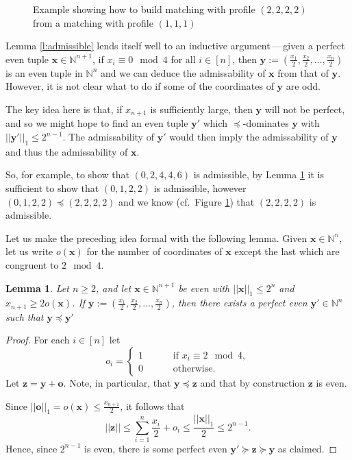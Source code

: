 \documentclass{article}
\newtheorem{lemma}[theorem]{Lemma}
\begin{document}
\begin{figure}[!ht]
\begin{minipage}{.4\textwidth}
\end{minipage}
\hfill
\caption{Example showing how to build matching with profile $(2,2,2,2)$ from a matching with profile $(1,1,1)$}\label{f:3dim}
\end{figure}

Lemma \ref{l:admissible} lends itself well to an inductive argument\,---\,given a perfect even tuple $\bm{x} \in \mathbb{N}^{n+1}$, if $x_i \equiv 0 \mod 4$ for all $i \in [n]$, then $\bm{y} := \left( \frac{x_1}{2},\frac{x_2}{2},\ldots,\frac{x_n}{2}\right)$ is an even tuple in $\mathbb{N}^{n}$ and we can deduce the admissability of $\bm{x}$ from that of $\bm{y}$. However, it is not clear what to do if some of the coordinates of $\bm{y}$ are odd.

The key idea here is that, if $x_{n+1}$ is sufficiently large, then $\bm{y}$ will not be perfect, and so we might hope to find an even tuple $\bm{y'}$ which $\preceq$-dominates $\bm{y}$ with $||\bm{y'}||_1 \leq 2^{n-1}$. The admissability of $\bm{y'}$ would then imply the admissability of $\bm{y}$ and thus the admissability of $\bm{x}$.

So, for example, to show that $(0,2,4,4,6)$ is admissible, by Lemma \ref{l:first} it is sufficient to show that $(0,1,2,2)$ is admissible, however $(0,1,2,2) \preceq (2,2,2,2)$ and we know (cf.~Figure \ref{f:3dim}) that $(2,2,2,2)$ is admissible.

Let us make the preceding idea formal with the following lemma. Given $\bm{x} \in \mathbb{N}^n$, let us write $o(\bm{x})$ for the number of coordinates of $\bm{x}$ except the last which are congruent to $2 \mod 4$.

\begin{lemma}\label{l:first}
Let $n\geq 2$, and let $\bm{x} \in \mathbb{N}^{n+1}$ be even with $||\bm{x}||_1 \leq 2^{n}$ and $x_{n+1} \geq 2 o(\bm{x})$. If $\bm{y} := \left(\frac{x_1}{2},\frac{x_2}{2}, \ldots, \frac{x_n}{2}\right)$, then there exists a perfect even $\bm{y'} \in \mathbb{N}^n$ such that $\bm{y} \preceq \bm{y'}$
\end{lemma}
\begin{proof}
For each $i \in [n]$ let 
\[
o_i = \begin{cases} 1 \qquad &\text{ if } x_i \equiv 2 \mod 4,\\
0 \qquad &\text{ otherwise}.\end{cases}
\]
Let $\bm{z} = \bm{y} + \bm{o}$. Note, in particular, that $\bm{y} \preceq \bm{z}$ and that by construction $\bm{z}$ is even.

Since $||\bm{o}||_1 = o(\bm{x}) \leq \frac{x_{n+1}}{2}$, it follows that 
\[
||\bm{z}|| \leq \sum_{i=1}^n \frac{x_i}{2} + o_i \leq \frac{||\bm{x}||_1}{2} \leq 2^{n-1}.
\]
Hence, since $2^{n-1}$ is even, there is some perfect even $\bm{y'} \succeq \bm{z} \succeq \bm{y}$ as claimed.
\end{proof}
\end{document}
